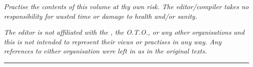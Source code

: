 {\textit{Practise the contents of this volume at thy own risk. The editor/compiler takes no responsibility for wasted time or damage to health and/or sanity.}

\textit{The editor is not affiliated with the \Argentium{}{} , the O.T.O., or any other organisations and this is not intended to represent their views or practises in any way. Any references to either organisation were left in as in the original texts.}

\begin{center}
  \rule{1in}{0.5pt}
\end{center}
\vspace*{\fill}
}
